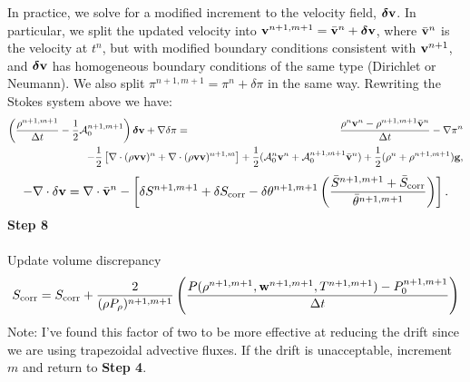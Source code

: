 \documentclass[final]{siamltex}
\def\gb {{\bf g}}
\def\vb {{\bf v}}
\def\wb {{\bf w}}
\def\deltab {\boldsymbol{\delta}}
\def\half   {\frac{1}{2}}
\begin{document}
{\color{red}
In practice, we solve for a modified increment to the velocity field, $\deltab\vb$.  In particular,
we split the updated velocity into
$\vb^{n+1,m+1} = \bar{\vb}^n + \deltab\vb$, where $\bar{\vb}^n$ is the velocity at $t^n$, but with modified boundary
conditions consistent with $\vb^{n+1}$, 
and $\deltab\vb$ has homogeneous boundary conditions of the same type 
(Dirichlet or Neumann).
We also split $\pi^{n+1,m+1} = \pi^n + \delta\pi$ in the same way.
Rewriting the Stokes system above we have:
\begin{eqnarray}
\left(\frac{\rho^{n+1,m+1}}{\Delta t} - \half\mathcal{A}_0^{n+1,m+1}\right)\deltab\vb + \nabla\delta\pi &=& \frac{\rho^n\vb^n - \rho^{n+1,m+1}\bar{\vb}^n}{\Delta t} - \nabla\pi^n\nonumber\\
&&\hspace{-1.5in} - \half\left[\nabla\cdot(\rho\vb\vb)^n + \nabla\cdot(\rho\vb\vb)^{n+1,m}\right] + \half(\mathcal{A}_0^n\vb^n+\mathcal{A}_0^{n+1,m+1}\bar{\vb}^n) + \half(\rho^n + \rho^{n+1,m+1})\gb,\nonumber\\
\end{eqnarray}
\begin{equation}
-\nabla\cdot\delta\vb = \nabla\cdot\bar{\vb}^n - \left[\delta S^{n+1,m+1} + \delta S_{\rm corr} - \delta\theta^{n+1,m+1}\left(\frac{\bar{S}^{n+1,m+1} + \bar{S}_{\rm corr}}{\bar{\theta}^{n+1,m+1}}\right)\right].
\end{equation}
}%
{\bf Step 8}\\ \\
Update volume discrepancy
\begin{equation}
S_{\rm corr} = S_{\rm corr} + \frac{2}{(\rho P_\rho)^{n+1,m+1}}\left(\frac{P(\rho^{n+1,m+1},\wb^{n+1,m+1},T^{n+1,m+1}) - P_0^{n+1,m+1}}{\Delta t}\right)
\end{equation}
Note: I've found this factor of two to be more effective at reducing the drift
since we are using trapezoidal advective fluxes.  If the drift is unacceptable,
increment $m$ and return to {\bf Step 4}.
\end{document}
